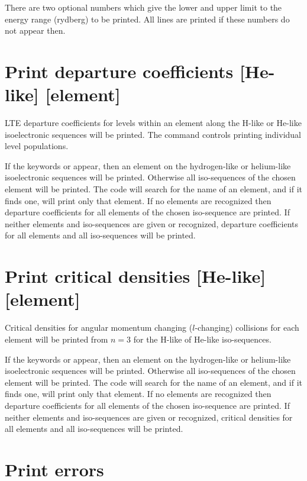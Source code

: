 There are two optional numbers which give the lower and upper limit to
the energy range (rydberg) to be printed.
All lines are printed if these
numbers do not appear then.

\section{Print departure coefficients [He-like] [element]}

LTE departure coefficients for levels within an element along the H-like
or He-like isoelectronic sequences will be printed.
The 
command controls printing individual level populations.

If the keywords  or  appear,
then an element on the hydrogen-like or helium-like
isoelectronic sequences will be printed.
Otherwise all iso-sequences of the chosen element will be printed.
The code will search for the name of
an element, and if it finds one, will print only that element.
If no
elements are recognized then departure coefficients for all elements of the chosen
iso-sequence are printed.
If neither elements and iso-sequences are given or recognized, departure coefficients for
all elements and all iso-sequences will be printed.

\section{Print critical densities [He-like] [element]}

Critical densities for angular momentum changing ($l$-changing) collisions for
each element will be printed from $n=3$ for the H-like of He-like iso-sequences. 

If the keywords  or  appear,
then an element on the hydrogen-like or helium-like
isoelectronic sequences will be printed.
Otherwise all iso-sequences of the chosen element will be printed.
The code will search for the name of
an element, and if it finds one, will print only that element.
If no
elements are recognized then departure coefficients for all elements of the chosen
iso-sequence are printed.
If neither elements and iso-sequences are given or recognized, critical
densities for all elements and all iso-sequences will be printed.

\section{Print errors}

